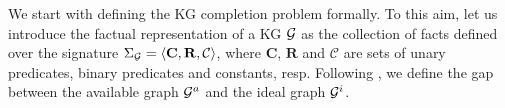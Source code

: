 
We start with defining the KG completion problem formally.
To this aim, let us introduce the
factual representation %
of a KG $\mathcal{G}$ as the collection of facts defined over the signature 
$\Sigma_{\mathcal{G}}=\langle\mathbf{C},\mathbf{R},\mathcal{C}\rangle$, where
$\mathbf{C}$, $\mathbf{R}$ and $\mathcal{C}$ are sets of unary predicates, binary predicates and constants, resp.
Following \cite{DBLP:conf/semweb/DarariNPR13}, we define the gap between the available graph $\mathcal{G}^a$ and the ideal graph $\mathcal{G}^i$. 

